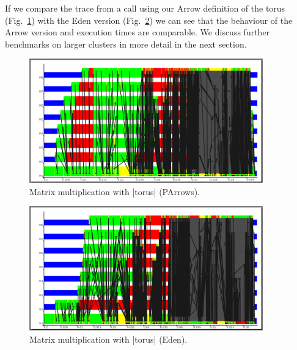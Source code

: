 If we compare the trace from a call using our Arrow definition of the torus (Fig.~\ref{fig:torus_parrows_trace}) with the Eden version (Fig.~\ref{fig:torus_eden_trace}) we can see that the behaviour of the Arrow version and execution times are comparable. We discuss further benchmarks on larger clusters in more detail in the next section.
\begin{figure}[tb]
	\centering
	\includegraphics[width=0.9\textwidth]{images/torus_matrix_parrows_scale}
	\caption[Matrix multiplication with |torus| (PArrows)]{Matrix multiplication with |torus| (PArrows).}
	\label{fig:torus_parrows_trace}
\end{figure}

\begin{figure}[tb]
	\centering
	\includegraphics[width=0.9\textwidth]{images/torus_matrix_eden_scale}
	\caption[Matrix multiplication with |torus| (Eden)]{Matrix multiplication with |torus| (Eden).}
	\label{fig:torus_eden_trace}
\end{figure}


